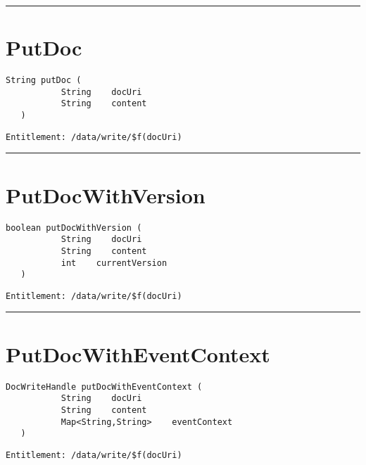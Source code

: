 \rule{12cm}{2pt}
\section{PutDoc}
\label{Api:PutDoc}
\begin{lstlisting}[style=nonumbers]
   String putDoc (
           String    docUri
           String    content
   )
\end{lstlisting}
\begin{Verbatim}[formatcom=\color{Maroon}]
  Entitlement: /data/write/$f(docUri)
\end{Verbatim}



\rule{12cm}{2pt}
\section{PutDocWithVersion}
\label{Api:PutDocWithVersion}
\begin{lstlisting}[style=nonumbers]
   boolean putDocWithVersion (
           String    docUri
           String    content
           int    currentVersion
   )
\end{lstlisting}
\begin{Verbatim}[formatcom=\color{Maroon}]
  Entitlement: /data/write/$f(docUri)
\end{Verbatim}



\rule{12cm}{2pt}
\section{PutDocWithEventContext}
\label{Api:PutDocWithEventContext}
\begin{lstlisting}[style=nonumbers]
   DocWriteHandle putDocWithEventContext (
           String    docUri
           String    content
           Map<String,String>    eventContext
   )
\end{lstlisting}
\begin{Verbatim}[formatcom=\color{Maroon}]
  Entitlement: /data/write/$f(docUri)
\end{Verbatim}



